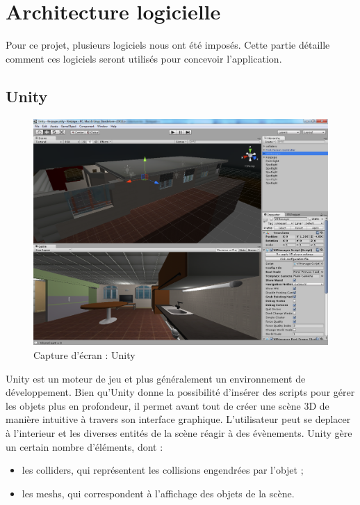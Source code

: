 \section{Architecture logicielle}
Pour ce projet, plusieurs logiciels nous ont été imposés. Cette partie détaille comment ces logiciels seront utilisés pour concevoir l'application.

\subsection{Unity}
\begin{figure}[h]
  \includegraphics[width=1\textwidth]{4-Conception/img/unity_screenshot.png}
  \caption{Capture d'écran : Unity}
  \label{unity}
\end{figure}

Unity est un moteur de jeu et plus généralement un environnement de développement. Bien qu'Unity donne la possibilité d'insérer des scripts pour gérer les objets plus en profondeur, il permet avant tout de créer une scène 3D de manière intuitive à travers son interface graphique. L'utilisateur peut se deplacer à l'interieur et les diverses entités de la scène réagir à des évènements. Unity gère un certain nombre d'éléments, dont :
\begin{itemize}
        \item les colliders, qui représentent les collisions engendrées par l'objet ;
        \item les meshs, qui correspondent à l'affichage des objets de la scène.
\end{itemize}


